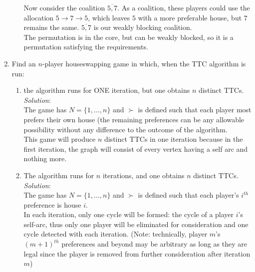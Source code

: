 \documentclass{article}
\begin{document}
\begin{enumerate}
\begin{enumerate}
  Now consider the coalition $\overline{5, 7}$. As a coalition, these players could use the allocation $5 \rightarrow 7 \rightarrow 5$, which leaves $5$ with a more preferable house, but $7$ remains the same. $\overline{5, 7}$ is our weakly blocking coalition. \\

  The permutation is in the core, but can be weakly blocked, so it is a permutation satisfying the requirements. \\
  \end{enumerate}

%
\item Find an $n$-player houseswapping game in which, when the TTC algorithm is run:

  \begin{enumerate}
  \item the algorithm runs for ONE iteration, but one obtains $n$ distinct TTCs. \\

  \textit{Solution}: \\

  The game has $N = \{1, \dots, n\}$ and $\succ$ is defined such that each player most prefers their own house (the remaining preferences can be any allowable possibility without any difference to the outcome of the algorithm. \\

  This game will produce $n$ distinct TTCs in one iteration because in the first iteration, the graph will consist of every vertex having a self arc and nothing more. \\

  \item The algorithm runs for $n$ iterations, and one obtains $n$ distinct TTCs. \\

  \textit{Solution}: \\

  The game has $N = \{1, \dots, n\}$ and $\succ$ is defined such that each player's $i^{th}$ preference is house $i$. \\

  In each iteration, only one cycle will be formed: the cycle of a player $i$'s self-arc, thus only one player will be eliminated for consideration and one cycle detected with each iteration. (Note: technically, player $m$'s $(m + 1)^{th}$ preferences and beyond may be arbitrary as long as they are legal since the player is removed from further consideration after iteration $m$) \\


\end{enumerate}
\end{enumerate}
\end{document}
